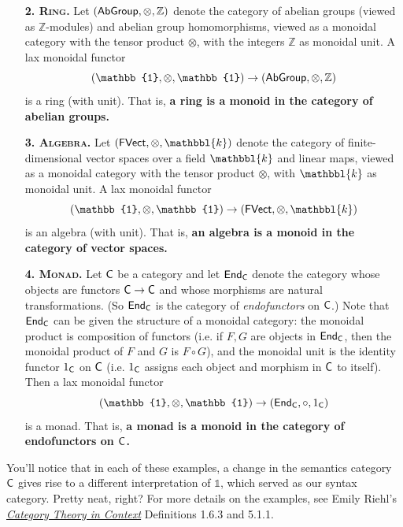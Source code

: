 \documentclass{tufte-handout-tai}
\newcommand{\cat}[1]{{\normalfont\textsf{#1}}}
\newcommand{\tai}[1]{{\color{magenta}#1}}
\theoremstyle{plain}
\theoremstyle{definition}
\theoremstyle{remark}
\begin{document}
\begin{itemize}
	\item [\textsc{\textbf{2. Ring.}}] Let $(\cat{AbGroup},\otimes,\mathbb{Z})$ denote the category of abelian groups (viewed as $\mathbb{Z}$-modules) and abelian group homomorphisms, viewed as a monoidal category with the tensor product $\otimes$, with the integers $\mathbb{Z}$ as monoidal unit. A lax monoidal functor
		\[(\mathbb{1},\otimes,\mathbb{1}) \to (\cat{AbGroup},\otimes,\mathbb{Z})\]
	is a ring (with unit). That is, \textbf{a ring is a monoid in the category of abelian groups.}
	\item [\textsc{\textbf{3. Algebra.}}]  Let $(\cat{FVect},\otimes,\mathbbl{k})$ denote the category of finite-dimensional vector spaces over a field $\mathbbl{k}$ and linear maps, viewed as a monoidal category with the tensor product $\otimes$, with $\mathbbl{k}$ as monoidal unit. A lax monoidal functor 
		\[(\mathbb{1},\otimes,\mathbb{1}) \to (\cat{FVect},\otimes,\mathbbl{k})\]
	is an algebra (with unit). That is, \textbf{an algebra is a monoid in the category of vector spaces.}

	\item [\textsc{\textbf{4. Monad.}}]	Let $\cat{C}$ be a category and let $\cat{End}_\cat{C}$ denote the category whose objects are functors $\cat{C}\to\cat{C}$ and whose morphisms are natural transformations. (So $\cat{End}_\cat{C}$ is the category of \textit{endofunctors} on $\cat{C}$.) Note that $\cat{End}_\cat{C}$ can be given the structure of a monoidal category: the monoidal product is composition of functors (i.e. if $F,G$ are objects in $\cat{End}_\cat{C}$, then the monoidal product of $F$ and $G$ is $F\circ G$), and the monoidal unit is the identity functor $1_{\cat{C}}$ on $\cat{C}$ (i.e. $1_{\cat{C}}$ assigns each object and morphism in $\cat{C}$ to itself). Then a lax monoidal functor
		\[(\mathbb{1},\otimes,\mathbb{1}) \to (\cat{End}_\cat{C},\circ,1_{\cat{C}})\]
	is a monad. That is, \textbf{a monad is a monoid in the category of endofunctors on $\cat{C}$.}
\end{itemize}
You'll notice that in each of these examples, a change in the semantics category $\cat{C}$ gives rise to a different interpretation of $\mathbb{1}$, which served as our syntax category. Pretty neat, right? For more details on the examples, see Emily Riehl's \textit{\href{http://www.math.jhu.edu/~eriehl/context.pdf}{Category Theory in Context}} Definitions 1.6.3 and 5.1.1.
\end{document}
